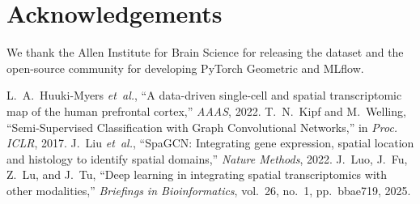 \documentclass[conference]{IEEEtran}
\begin{document}
\section*{Acknowledgements}
We thank the Allen Institute for Brain Science for releasing the dataset and the 
open-source community for developing PyTorch Geometric and MLflow.

\begin{thebibliography}{00}
 L.~A.~Huuki-Myers \emph{et~al.}, ``A data-driven 
single-cell and spatial transcriptomic map of the human prefrontal cortex,'' 
\emph{AAAS}, 2022.
 T.~N.~Kipf and M.~Welling, ``Semi-Supervised 
Classification with Graph Convolutional Networks,'' in \emph{Proc. ICLR}, 2017.
 J.~Liu \emph{et~al.}, ``SpaGCN: Integrating gene 
expression, spatial location and histology to identify spatial domains,'' 
\emph{Nature Methods}, 2022.
 J.~Luo, J.~Fu, Z.~Lu, and J.~Tu, ``Deep learning in 
integrating spatial transcriptomics with other modalities,'' \emph{Briefings in 
Bioinformatics}, vol.~26, no.~1, pp.~bbae719, 2025.
\end{thebibliography}
\end{document}
